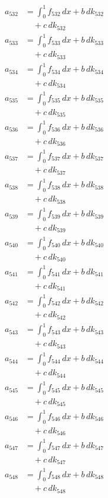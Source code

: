 \documentclass{article}
\begin{document}
\begin{align}
a_{532} &= \int_0^1 f_{532}\,dx + b\,dk_{532} \\
&\quad + c\,dk_{532} \\
a_{533} &= \int_0^1 f_{533}\,dx + b\,dk_{533} \\
&\quad + c\,dk_{533} \\
a_{534} &= \int_0^1 f_{534}\,dx + b\,dk_{534} \\
&\quad + c\,dk_{534} \\
a_{535} &= \int_0^1 f_{535}\,dx + b\,dk_{535} \\
&\quad + c\,dk_{535} \\
a_{536} &= \int_0^1 f_{536}\,dx + b\,dk_{536} \\
&\quad + c\,dk_{536} \\
a_{537} &= \int_0^1 f_{537}\,dx + b\,dk_{537} \\
&\quad + c\,dk_{537} \\
a_{538} &= \int_0^1 f_{538}\,dx + b\,dk_{538} \\
&\quad + c\,dk_{538} \\
a_{539} &= \int_0^1 f_{539}\,dx + b\,dk_{539} \\
&\quad + c\,dk_{539} \\
a_{540} &= \int_0^1 f_{540}\,dx + b\,dk_{540} \\
&\quad + c\,dk_{540} \\
a_{541} &= \int_0^1 f_{541}\,dx + b\,dk_{541} \\
&\quad + c\,dk_{541} \\
a_{542} &= \int_0^1 f_{542}\,dx + b\,dk_{542} \\
&\quad + c\,dk_{542} \\
a_{543} &= \int_0^1 f_{543}\,dx + b\,dk_{543} \\
&\quad + c\,dk_{543} \\
a_{544} &= \int_0^1 f_{544}\,dx + b\,dk_{544} \\
&\quad + c\,dk_{544} \\
a_{545} &= \int_0^1 f_{545}\,dx + b\,dk_{545} \\
&\quad + c\,dk_{545} \\
a_{546} &= \int_0^1 f_{546}\,dx + b\,dk_{546} \\
&\quad + c\,dk_{546} \\
a_{547} &= \int_0^1 f_{547}\,dx + b\,dk_{547} \\
&\quad + c\,dk_{547} \\
a_{548} &= \int_0^1 f_{548}\,dx + b\,dk_{548} \\
&\quad + c\,dk_{548} \\

\end{align}
\end{document}
